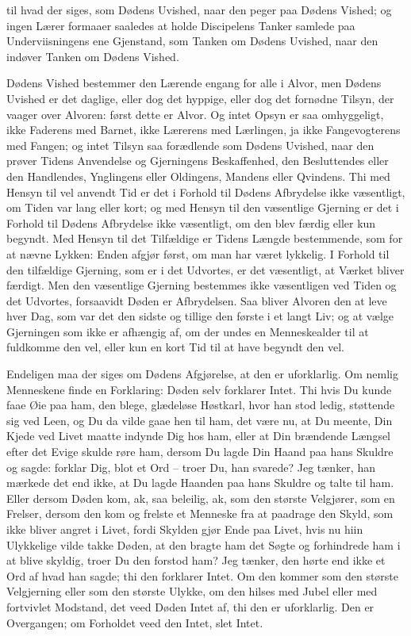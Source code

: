 \documentclass[12pt,a4paper]{article}
\begin{document}
til hvad der siges, som Dødens Uvished, naar den peger paa Dødens Vished; og ingen Lærer formaaer saaledes at holde Discipelens Tanker samlede paa Underviisningens ene Gjenstand, som Tanken om Dødens Uvished, naar den indøver Tanken om Dødens Vished.

Dødens Vished bestemmer den Lærende engang for alle i Alvor, men Dødens Uvished er det daglige, eller dog det hyppige, eller dog det fornødne Tilsyn, der vaager over Alvoren: først dette er Alvor. Og intet Opsyn er saa omhyggeligt, ikke Faderens med Barnet, ikke Lærerens med Lærlingen, ja ikke Fangevogterens med Fangen; og intet Tilsyn saa forædlende som Dødens Uvished, naar den prøver Tidens Anvendelse og Gjerningens Beskaffenhed, den Besluttendes eller den Handlendes, Ynglingens eller Oldingens, Mandens eller Qvindens. Thi med Hensyn til vel anvendt Tid er det i Forhold til Dødens Afbrydelse ikke væsentligt, om Tiden var lang eller kort; og med Hensyn til den væsentlige Gjerning er det i Forhold til Dødens Afbrydelse ikke væsentligt, om den blev færdig eller kun begyndt. Med Hensyn til det Tilfældige er Tidens Længde bestemmende, som for at nævne Lykken: Enden afgjør først, om man har været lykkelig. I Forhold til den tilfældige Gjerning, som er i det Udvortes, er det væsentligt, at Værket bliver færdigt. Men den væsentlige Gjerning bestemmes ikke væsentligen ved Tiden og det Udvortes, forsaavidt Døden er Afbrydelsen. Saa bliver Alvoren den at leve hver Dag, som var det den sidste og tillige den første i et langt Liv; og at vælge Gjerningen som ikke er afhængig af, om der undes en Menneskealder til at fuldkomme den vel, eller kun en kort Tid til at have begyndt den vel.

Endeligen maa der siges om Dødens Afgjørelse, at den er uforklarlig. Om nemlig Menneskene finde en Forklaring: Døden selv forklarer Intet. Thi hvis Du kunde faae Øie paa ham, den blege, glædeløse Høstkarl, hvor han stod ledig, støttende sig ved Leen, og Du da vilde gaae hen til ham, det være nu, at Du meente, Din Kjede ved Livet maatte indynde Dig hos ham, eller at Din brændende Længsel efter det Evige skulde røre ham, dersom Du lagde Din Haand paa hans Skuldre og sagde: forklar Dig, blot et Ord – troer Du, han svarede? Jeg tænker, han mærkede det end ikke, at Du lagde Haanden paa hans Skuldre og talte til ham. Eller dersom Døden kom, ak, saa beleilig, ak, som den største Velgjører, som en Frelser, dersom den kom og frelste et Menneske fra at paadrage den Skyld, som ikke bliver angret i Livet, fordi Skylden gjør Ende paa Livet, hvis nu hiin Ulykkelige vilde takke Døden, at den bragte ham det Søgte og forhindrede ham i at blive skyldig, troer Du den forstod ham? Jeg tænker, den hørte end ikke et Ord af hvad han sagde; thi den forklarer Intet. Om den kommer som den største Velgjerning eller som den største Ulykke, om den hilses med Jubel eller med fortvivlet Modstand, det veed Døden Intet af, thi den er uforklarlig. Den er Overgangen; om Forholdet veed den Intet, slet Intet.
\end{document}
